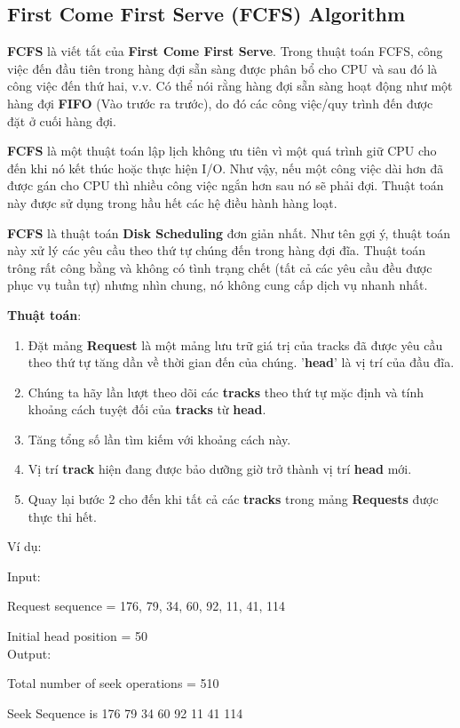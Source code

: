 \documentclass{report}
\begin{document}
    \subsection{First Come First Serve (FCFS) Algorithm}

    \textbf{FCFS} là viết tắt của \textbf{First Come First Serve}. Trong thuật toán FCFS, công việc đến đầu tiên trong hàng đợi sẵn sàng được phân bổ cho CPU và sau đó là công việc đến thứ hai, v.v. Có thể nói rằng hàng đợi sẵn sàng hoạt động như một hàng đợi \textbf{FIFO} (Vào trước ra trước), do đó các công việc/quy trình đến được đặt ở cuối hàng đợi.  

    \textbf{FCFS} là một thuật toán lập lịch không ưu tiên vì một quá trình giữ CPU cho đến khi nó kết thúc hoặc thực hiện I/O. Như vậy, nếu một công việc dài hơn đã được gán cho CPU thì nhiều công việc ngắn hơn sau nó sẽ phải đợi. Thuật toán này được sử dụng trong hầu hết các hệ điều hành hàng loạt. 

    \textbf{FCFS} là thuật toán \textbf{Disk Scheduling} đơn giản nhất. Như tên gợi ý, thuật toán này xử lý các yêu cầu theo thứ tự chúng đến trong hàng đợi đĩa. Thuật toán trông rất công bằng và không có tình trạng chết (tất cả các yêu cầu đều được phục vụ tuần tự) nhưng nhìn chung, nó không cung cấp dịch vụ nhanh nhất.

    \textbf{Thuật toán}: 
    \begin{enumerate}
        \item 
            Đặt mảng \textbf{Request} là một mảng lưu trữ giá trị của tracks đã được yêu cầu theo thứ tự tăng dần về thời gian đến của chúng. '\textbf{head}' là vị trí của đầu đĩa.
    
        \item 
            Chúng ta hãy lần lượt theo dõi các \textbf{tracks} theo thứ tự mặc định và tính khoảng cách tuyệt đối của \textbf{tracks} từ \textbf{head}.
        \item 
            Tăng tổng số lần tìm kiếm với khoảng cách này.
        \item 
            Vị trí \textbf{track} hiện đang được bảo dưỡng giờ trở thành vị trí \textbf{head} mới.
        \item 
            Quay lại bước 2 cho đến khi tất cả các \textbf{tracks} trong mảng \textbf{Requests} được thực thi hết.
    \end{enumerate}

    Ví dụ:

    \begin{tcolorbox}
    
        Input: 
        
        Request sequence = {176, 79, 34, 60, 92, 11, 41, 114}
        
        Initial head position = 50\\
        
        Output:
        
        Total number of seek operations = 510
        
        Seek Sequence is 176 79 34 60 92 11 41 114
        
    \end{tcolorbox} 
\end{document}

